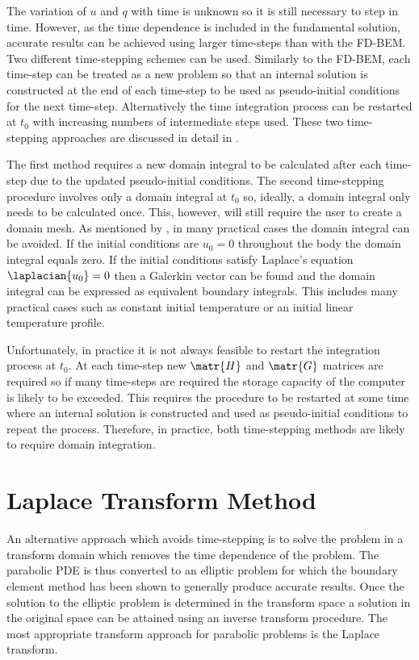 The variation of $u$ and $q$ with time is unknown so it is still necessary
to step in time.  However, as the time dependence is included in the
fundamental solution, accurate results can be achieved using larger
time-steps than with the FD-BEM.  Two different time-stepping schemes can
be used.  Similarly to the FD-BEM, each time-step can be treated as a new
problem so that an internal solution is constructed at the end of each
time-step to be used as pseudo-initial conditions for the next time-step.
Alternatively the time integration process can be restarted at $t_{0}$ with
increasing numbers of intermediate steps used.  These two time-stepping
approaches are discussed in detail in \citet{brebbia:1984}.

The first method requires a new domain integral to be calculated after each
time-step due to the updated pseudo-initial conditions.  The second
time-stepping procedure involves only a domain integral at $t_{0}$ so,
ideally, a domain integral only needs to be calculated once. This, however,
will still require the user to create a domain mesh. As mentioned by
\citet{brebbia:1984}, in many practical cases the domain integral can
be avoided. If the initial conditions are $u_{0} = 0$ throughout the body
the domain integral equals zero. If the initial conditions satisfy
Laplace's equation $\laplacian{u_{0}} = 0$ then a Galerkin vector can be found
and the domain integral can be expressed as equivalent boundary integrals.
This includes many practical cases such as constant initial temperature or
an initial linear temperature profile.

Unfortunately, in practice it is not always feasible to restart the
integration process at $t_{0}$. At each time-step new $\matr{H}$ and
$\matr{G}$ matrices are required so if many time-steps are required the
storage capacity of the computer is likely to be exceeded.  This requires
the procedure to be restarted at some time where an internal solution is
constructed and used as pseudo-initial conditions to repeat the process.
Therefore, in practice, both time-stepping methods are likely to require
domain integration.

\section{Laplace Transform Method}

An alternative approach which avoids time-stepping is to solve the problem
in a transform domain which removes the time dependence of the problem.
The parabolic PDE is thus converted to an elliptic problem for which the
boundary element method has been shown to generally produce accurate
results.  Once the solution to the elliptic problem is determined in the
transform space a solution in the original space can be attained using an
inverse transform procedure.  The most appropriate transform approach for
parabolic problems is the Laplace transform.

